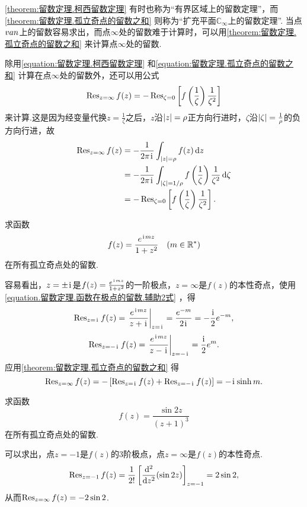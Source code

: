 \cref{theorem:留数定理.柯西留数定理} 有时也称为“有界区域上的留数定理”，而\cref{theorem:留数定理.孤立奇点的留数之和} 则称为“扩充平面\(\mathbb{C}_{\infty}\)上的留数定理”.
当点\(v{a}{n}\)上的留数容易求出，而点\(\infty\)处的留数难于计算时，可以用\cref{theorem:留数定理.孤立奇点的留数之和} 来计算点\(\infty\)处的留数.

除用\cref{equation:留数定理.柯西留数定理} 和\cref{equation:留数定理.孤立奇点的留数之和} 计算在点\(\infty\)处的留数外，还可以用公式\begin{equation}
\operatorname{Res}_{z=\infty} f(z)
= -\operatorname{Res}_{\zeta=0} \left[ f\left(\frac{1}{\zeta}\right) \frac{1}{\zeta^2} \right]
\end{equation}来计算.这是因为经变量代换\(z = \frac{1}{\zeta}\)之后，\(z\)沿\(\abs{z}=\rho\)正方向行进时，\(\zeta\)沿\(\abs{\zeta}=\frac{1}{\rho}\)的负方向行进，故\begin{align*}
\operatorname{Res}_{z=\infty} f(z)
&= -\frac{1}{2\pi\kern1pt\mathrm{i}\kern1pt} \int_{\abs{z}=\rho} f(z) \dd{z} \\
&= -\frac{1}{2\pi\kern1pt\mathrm{i}\kern1pt} \int_{\abs{\zeta}=1/\rho} f\left(\frac{1}{\zeta}\right) \frac{1}{\zeta^2} \dd{\zeta} \\
&= -\operatorname{Res}_{\zeta=0} \left[ f\left(\frac{1}{\zeta}\right) \frac{1}{\zeta^2} \right].
\end{align*}

\begin{example}
求函数\[
f(z) = \frac{e^{\kern1pt\mathrm{i}\kern1pt mz}}{1+z^2} \quad(m\in\mathbb{R}^*)
\]在所有孤立奇点处的留数.
\begin{solution}
容易看出，\(z=\pm\kern1pt\mathrm{i}\kern1pt\)是\(f(z) = \frac{e^{\kern1pt\mathrm{i}\kern1pt mz}}{1+z^2}\)的一阶极点，\(z=\infty\)是\(f(z)\)的本性奇点，使用\cref{equation.留数定理.函数在极点的留数.辅助2式} ，得\[
\Res_{z=\iu} f(z)
= \eval{\frac{e^{\iu mz}}{z+\iu}}_{z=\iu}
= \frac{e^{-m}}{2\iu}
= -\frac{\iu}{2} e^{-m},
\]\[
\Res_{z=-\iu} f(z)
= \eval{\frac{e^{\iu mz}}{z-\iu}}_{z=-\iu}
= \frac{\iu}{2} e^m.
\]
应用\cref{theorem:留数定理.孤立奇点的留数之和} 得\[
\operatorname{Res}_{z=\infty} f(z)
= -\left[ \operatorname{Res}_{z=\kern1pt\mathrm{i}\kern1pt} f(z) + \operatorname{Res}_{z=-\kern1pt\mathrm{i}\kern1pt} f(z) \right]
= -\kern1pt\mathrm{i}\kern1pt \sinh m.
\]
\end{solution}
\end{example}

\begin{example}
求函数\[
f(z) = \frac{\sin 2z}{(z+1)^3}
\]在所有孤立奇点处的留数.
\begin{solution}
可以求出，点\(z=-1\)是\(f(z)\)的3阶极点，点\(z=\infty\)是\(f(z)\)的本性奇点.\[
\operatorname{Res}_{z=-1} f(z)
= \frac{1}{2!} \left[ \dv[2]{z}(\sin 2z) \right]_{z=-1}
= 2 \sin 2,
\]从而\(\operatorname{Res}_{z=\infty} f(z) = -2 \sin 2\).
\end{solution}
\end{example}

